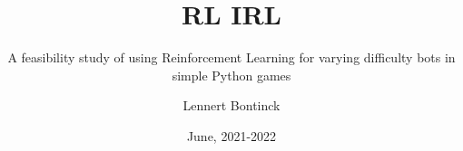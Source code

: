 \title{RL IRL}
\subtitle{A feasibility study of using Reinforcement Learning for varying difficulty bots in simple Python games}
\author{Lennert Bontinck}
\date{June, 2021-2022}
